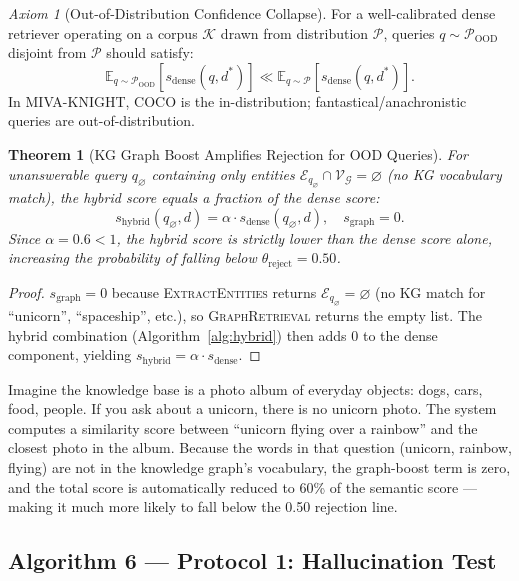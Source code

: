 \documentclass[12pt,a4paper]{article}
\theoremstyle{definition}
\theoremstyle{plain}
\newtheorem{theorem}{Theorem}[section]
\theoremstyle{remark}
\newtheorem{axiom}{Axiom}[section]
\begin{document}
\begin{axiom}[Out-of-Distribution Confidence Collapse]
\label{ax:ood}
For a well-calibrated dense retriever operating on a corpus
$\mathcal{K}$ drawn from distribution $\mathcal{P}$, queries
$q \sim \mathcal{P}_\text{OOD}$ disjoint from $\mathcal{P}$
should satisfy:
\[
  \mathbb{E}_{q \sim \mathcal{P}_{\text{OOD}}}\!\left[
    s_{\text{dense}}(q, d^*)\right] \ll
  \mathbb{E}_{q \sim \mathcal{P}}\!\left[
    s_{\text{dense}}(q, d^*)\right].
\]
In MIVA-KNIGHT, COCO is the in-distribution; fantastical/anachronistic
queries are out-of-distribution.
\end{axiom}

\begin{theorem}[KG Graph Boost Amplifies Rejection for OOD Queries]
\label{thm:ood}
For unanswerable query $q_\varnothing$ containing only entities
$\mathcal{E}_{q_\varnothing} \cap \mathcal{V}_\mathcal{G} = \varnothing$
(no KG vocabulary match), the hybrid score equals a fraction of the
dense score:
\[
  s_{\text{hybrid}}(q_\varnothing, d) = \alpha \cdot s_{\text{dense}}
  (q_\varnothing, d), \quad s_{\text{graph}} = 0.
\]
Since $\alpha = 0.6 < 1$, the hybrid score is strictly lower than the
dense score alone, increasing the probability of falling below
$\theta_{\text{reject}} = 0.50$.
\end{theorem}
\begin{proof}
$s_{\text{graph}} = 0$ because \textsc{ExtractEntities} returns
$\mathcal{E}_{q_\varnothing} = \varnothing$ (no KG match for
``unicorn'', ``spaceship'', etc.), so
\textsc{GraphRetrieval} returns the empty list.
The hybrid combination (Algorithm~\ref{alg:hybrid}) then adds $0$
to the dense component, yielding
$s_{\text{hybrid}} = \alpha \cdot s_{\text{dense}}$.
\end{proof}

\begin{tcolorbox}[laymanbox]
Imagine the knowledge base is a photo album of everyday objects: dogs,
cars, food, people. If you ask about a unicorn, there is no unicorn
photo. The system computes a similarity score between ``unicorn flying
over a rainbow'' and the closest photo in the album. Because the
words in that question (unicorn, rainbow, flying) are not in the
knowledge graph's vocabulary, the graph-boost term is zero, and the
total score is automatically reduced to 60\% of the semantic score ---
making it much more likely to fall below the 0.50 rejection line.
\end{tcolorbox}

\subsection{Algorithm 6 --- Protocol 1: Hallucination Test}
\end{document}
